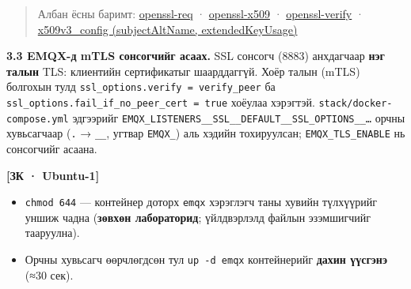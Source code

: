 \begin{quote}
Албан ёсны баримт: \href{https://docs.openssl.org/3.0/man1/openssl-req/}{openssl-req} · \href{https://docs.openssl.org/3.0/man1/openssl-x509/}{openssl-x509} · \href{https://docs.openssl.org/3.0/man1/openssl-verify/}{openssl-verify} · \href{https://docs.openssl.org/3.0/man5/x509v3_config/}{x509v3\_\allowbreak{}config (subjectAltName, extendedKeyUsage)}
\end{quote}

\textbf{3.3 EMQX-д mTLS сонсогчийг асаах.} SSL сонсогч (8883) анхдагчаар \textbf{нэг талын} TLS: клиентийн сертификатыг шаарддаггүй. Хоёр талын (mTLS) болгохын тулд \texttt{ssl\_\allowbreak{}options.\allowbreak{}verify\ =\allowbreak{}\ verify\_\allowbreak{}peer} ба \texttt{ssl\_\allowbreak{}options.\allowbreak{}fail\_\allowbreak{}if\_\allowbreak{}no\_\allowbreak{}peer\_\allowbreak{}cert\ =\allowbreak{}\ true} хоёулаа хэрэгтэй. \texttt{stack/\allowbreak{}docker-compose.\allowbreak{}yml} эдгээрийг \texttt{EMQX\_\allowbreak{}LISTENERS\_\allowbreak{}\_\allowbreak{}SSL\_\allowbreak{}\_\allowbreak{}DEFAULT\_\allowbreak{}\_\allowbreak{}SSL\_\allowbreak{}OPTIONS\_\allowbreak{}\_\allowbreak{}\ldots{}} орчны хувьсагчаар (\texttt{.} → \texttt{\_\allowbreak{}\_\allowbreak{}}, угтвар \texttt{EMQX\_}) аль хэдийн тохируулсан; \texttt{EMQX\_\allowbreak{}TLS\_\allowbreak{}ENABLE} нь сонсогчийг асаана.

\textbf{{[}ЗК · Ubuntu-1{]}}

\begin{Shaded}
\begin{Highlighting}[]
 
\end{Highlighting}
\end{Shaded}

\begin{itemize}
\tightlist
\item
  \texttt{chmod\ 644} --- контейнер доторх \texttt{emqx} хэрэглэгч таны хувийн түлхүүрийг уншиж чадна (\textbf{зөвхөн лабораторид}; үйлдвэрлэлд файлын эзэмшигчийг тааруулна).
\item
  Орчны хувьсагч өөрчлөгдсөн тул \texttt{up\ -d\ emqx} контейнерийг \textbf{дахин үүсгэнэ} (≈30 сек).
\end{itemize}

